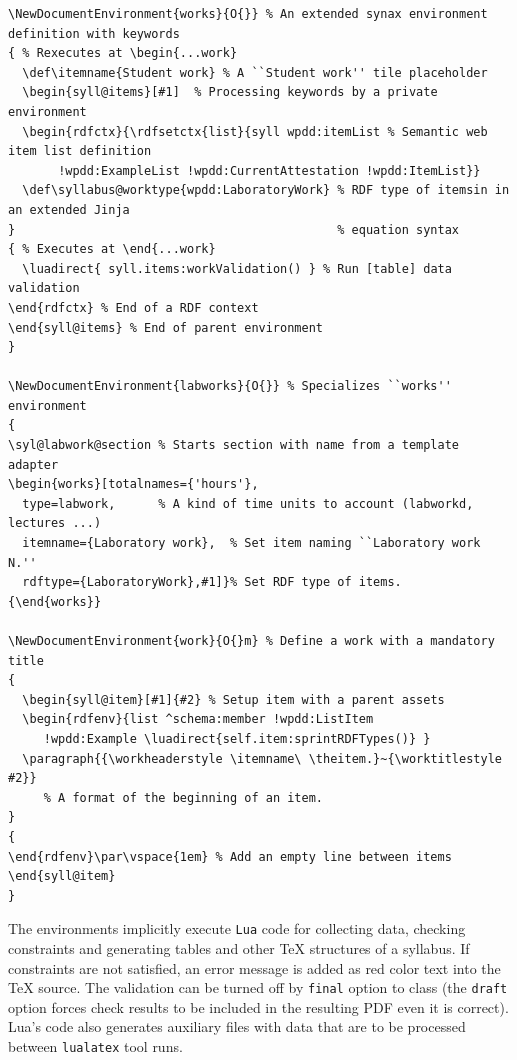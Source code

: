 \documentclass[
]{aiitart}
\begin{document}
\begin{verbatim}
\NewDocumentEnvironment{works}{O{}} % An extended synax environment definition with keywords
{ % Rexecutes at \begin{...work}
  \def\itemname{Student work} % A ``Student work'' tile placeholder
  \begin{syll@items}[#1]  % Processing keywords by a private environment
  \begin{rdfctx}{\rdfsetctx{list}{syll wpdd:itemList % Semantic web item list definition
       !wpdd:ExampleList !wpdd:CurrentAttestation !wpdd:ItemList}}
  \def\syllabus@worktype{wpdd:LaboratoryWork} % RDF type of itemsin in an extended Jinja
}                                             % equation syntax
{ % Executes at \end{...work}
  \luadirect{ syll.items:workValidation() } % Run [table] data validation
\end{rdfctx} % End of a RDF context
\end{syll@items} % End of parent environment
}

\NewDocumentEnvironment{labworks}{O{}} % Specializes ``works'' environment
{
\syl@labwork@section % Starts section with name from a template adapter
\begin{works}[totalnames={'hours'},
  type=labwork,      % A kind of time units to account (labworkd, lectures ...)
  itemname={Laboratory work},  % Set item naming ``Laboratory work N.''
  rdftype={LaboratoryWork},#1]}% Set RDF type of items.
{\end{works}}

\NewDocumentEnvironment{work}{O{}m} % Define a work with a mandatory title
{
  \begin{syll@item}[#1]{#2} % Setup item with a parent assets
  \begin{rdfenv}{list ^schema:member !wpdd:ListItem
     !wpdd:Example \luadirect{self.item:sprintRDFTypes()} }
  \paragraph{{\workheaderstyle \itemname\ \theitem.}~{\worktitlestyle #2}}
     % A format of the beginning of an item.
}
{
\end{rdfenv}\par\vspace{1em} % Add an empty line between items
\end{syll@item}
}
\end{verbatim}

The environments implicitly execute \verb|Lua| code for collecting data, checking constraints and generating tables and other \TeX{} structures of a syllabus.  If constraints are not satisfied, an error message is added as red color text into the \TeX{} source.   The validation can be turned off by \verb|final| option to class (the \verb|draft| option forces check results to be included in the resulting PDF even it is correct).  Lua's code also generates auxiliary files with data that are to be processed between \verb|lualatex| tool runs.
\end{document}
